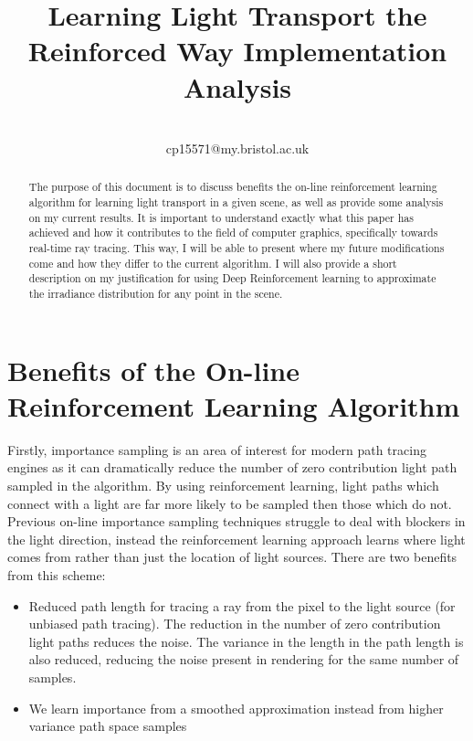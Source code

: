 \documentclass[conference]{IEEEtran}
\begin{document}
\title{Learning Light Transport the Reinforced Way Implementation Analysis}

\author{\\ cp15571@my.bristol.ac.uk }

\maketitle

\begin{abstract}
The purpose of this document is to discuss benefits the on-line reinforcement learning algorithm for learning light transport in a given scene, as well as provide some analysis on my current results. It is important to understand exactly what this paper has achieved and how it contributes to the field of computer graphics, specifically towards real-time ray tracing. This way, I will be able to present where my future modifications come and how they differ to the current algorithm. I will also provide a short description on my justification for using Deep Reinforcement learning to approximate the irradiance distribution for any point in the scene.
\end{abstract}

\section{Benefits of the On-line Reinforcement Learning Algorithm}
Firstly, importance sampling is an area of interest for modern path tracing engines as it can dramatically reduce the number of zero contribution light path sampled in the algorithm. By using reinforcement learning, light paths which connect with a light are far more likely to be sampled then those which do not. Previous on-line importance sampling techniques struggle to deal with blockers in the light direction, instead the reinforcement learning approach learns where light comes from rather than just the location of light sources. There are two benefits from this scheme:

\begin{itemize}
\item Reduced path length for tracing a ray from the pixel to the light source (for unbiased path tracing). The reduction in the number of zero contribution light paths reduces the noise. The variance in the length in the path length is also reduced, reducing the noise present in rendering for the same number of samples.


\item We learn importance from a smoothed approximation instead from higher
variance path space samples
\end{itemize}
\end{document}
